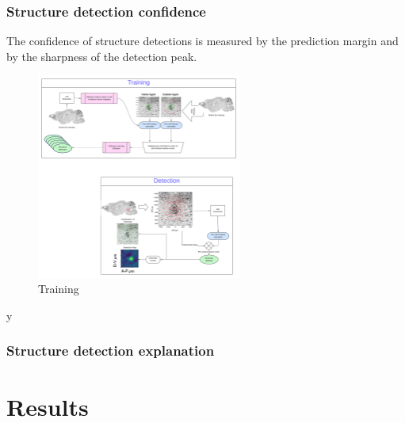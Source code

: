 \documentclass[runningheads]{llncs}
\begin{document}
\subsubsection { Structure detection confidence} The confidence of structure
  detections is measured by the prediction margin and by the sharpness
  of the detection peak.
\begin{figure}
\centering
\includegraphics[width=0.6\textwidth]{figures/Training.pdf}
\caption{Training \label{fig:training}}
\end{figure}
y
\subsubsection { Structure detection explanation}

\section{Results}
\end{document}
